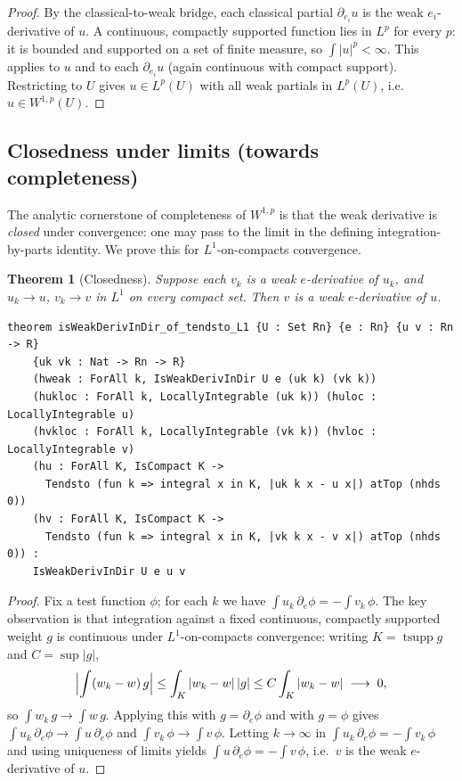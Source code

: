 ﻿\documentclass[12pt, a4paper]{article}
\renewcommand{\_}{\origunderscore\allowbreak}
\theoremstyle{definition}
\theoremstyle{plain}
\newtheorem{theorem}{Theorem}[section]
\begin{document}
\begin{proof}
By the classical-to-weak bridge, each classical partial $\partial_{e_i}u$ is the weak
$e_i$-derivative of $u$. A continuous, compactly supported function lies in $L^p$ for every
$p$: it is bounded and supported on a set of finite measure, so $\int|u|^p<\infty$. This
applies to $u$ and to each $\partial_{e_i}u$ (again continuous with compact support).
Restricting to $U$ gives $u\in L^p(U)$ with all weak partials in $L^p(U)$, i.e.\
$u\in W^{1,p}(U)$.
\end{proof}

\subsection{Closedness under limits (towards completeness)}

The analytic cornerstone of completeness of $W^{1,p}$ is that the weak derivative is
\emph{closed} under convergence: one may pass to the limit in the defining
integration-by-parts identity. We prove this for $L^1$-on-compacts convergence.

\begin{theorem}[Closedness]
Suppose each $v_k$ is a weak $e$-derivative of $u_k$, and $u_k\to u$, $v_k\to v$ in
$L^1$ on every compact set. Then $v$ is a weak $e$-derivative of $u$.
\end{theorem}

\begin{lstlisting}[caption={Closedness under L1-on-compacts limits (proved)}]
theorem isWeakDerivInDir_of_tendsto_L1 {U : Set Rn} {e : Rn} {u v : Rn -> R}
    {uk vk : Nat -> Rn -> R}
    (hweak : ForAll k, IsWeakDerivInDir U e (uk k) (vk k))
    (hukloc : ForAll k, LocallyIntegrable (uk k)) (huloc : LocallyIntegrable u)
    (hvkloc : ForAll k, LocallyIntegrable (vk k)) (hvloc : LocallyIntegrable v)
    (hu : ForAll K, IsCompact K ->
      Tendsto (fun k => integral x in K, |uk k x - u x|) atTop (nhds 0))
    (hv : ForAll K, IsCompact K ->
      Tendsto (fun k => integral x in K, |vk k x - v x|) atTop (nhds 0)) :
    IsWeakDerivInDir U e u v
\end{lstlisting}

\begin{proof}
Fix a test function $\phi$; for each $k$ we have $\int u_k\,\partial_e\phi=-\int
v_k\,\phi$. The key observation is that integration against a fixed continuous, compactly
supported weight $g$ is continuous under $L^1$-on-compacts convergence: writing
$K=\operatorname{tsupp}g$ and $C=\sup|g|$,
\[
  \Bigl|\int (w_k-w)\,g\Bigr|
  \le \int_K |w_k-w|\,|g|
  \le C\int_K |w_k-w| \;\longrightarrow\; 0,
\]
so $\int w_k\,g\to\int w\,g$. Applying this with $g=\partial_e\phi$ and with $g=\phi$ gives
$\int u_k\,\partial_e\phi\to\int u\,\partial_e\phi$ and $\int v_k\,\phi\to\int v\,\phi$.
Letting $k\to\infty$ in $\int u_k\,\partial_e\phi=-\int v_k\,\phi$ and using uniqueness of
limits yields $\int u\,\partial_e\phi=-\int v\,\phi$, i.e.\ $v$ is the weak $e$-derivative of
$u$.
\end{proof}
\end{document}
